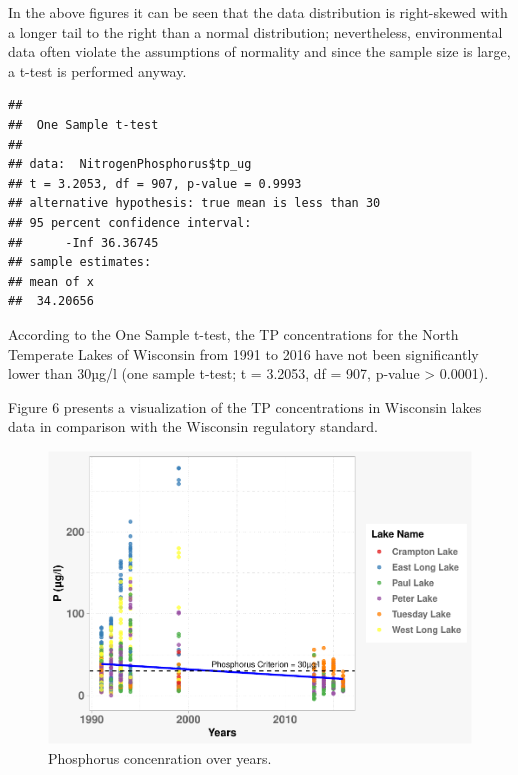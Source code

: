 \documentclass[12pt,]{article}
\newenvironment{Shaded}{\begin{snugshade}}{\end{snugshade}}
\newcommand{\DataTypeTok}[1]{\textcolor[rgb]{0.13,0.29,0.53}{#1}}
\newcommand{\DecValTok}[1]{\textcolor[rgb]{0.00,0.00,0.81}{#1}}
\newcommand{\KeywordTok}[1]{\textcolor[rgb]{0.13,0.29,0.53}{\textbf{#1}}}
\newcommand{\NormalTok}[1]{#1}
\newcommand{\OperatorTok}[1]{\textcolor[rgb]{0.81,0.36,0.00}{\textbf{#1}}}
\newcommand{\StringTok}[1]{\textcolor[rgb]{0.31,0.60,0.02}{#1}}
\begin{document}
In the above figures it can be seen that the data distribution is
right-skewed with a longer tail to the right than a normal distribution;
nevertheless, environmental data often violate the assumptions of
normality and since the sample size is large, a t-test is performed
anyway.

\begin{Shaded}
\end{Shaded}

\begin{verbatim}
## 
##  One Sample t-test
## 
## data:  NitrogenPhosphorus$tp_ug
## t = 3.2053, df = 907, p-value = 0.9993
## alternative hypothesis: true mean is less than 30
## 95 percent confidence interval:
##      -Inf 36.36745
## sample estimates:
## mean of x 
##  34.20656
\end{verbatim}

According to the One Sample t-test, the TP concentrations for the North
Temperate Lakes of Wisconsin from 1991 to 2016 have not been
significantly lower than 30µg/l (one sample t-test; t = 3.2053, df =
907, p-value \textgreater{} 0.0001).

Figure 6 presents a visualization of the TP concentrations in Wisconsin
lakes data in comparison with the Wisconsin regulatory standard.

\begin{figure}
\centering
\includegraphics{Eadala_ENV872_Project_files/figure-latex/fig6-1.pdf}
\caption{Phosphorus concenration over years.}
\end{figure}
\end{document}
